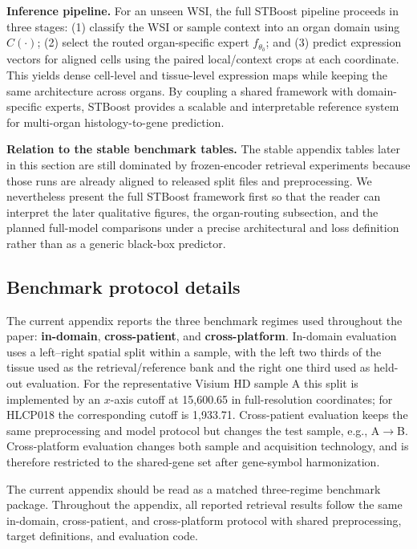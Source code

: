 \documentclass{article}
\begin{document}
\noindent\textbf{Inference pipeline.}
For an unseen WSI, the full STBoost pipeline proceeds in three stages: (1) classify the WSI or sample context into an organ domain using $C(\cdot)$; (2) select the routed organ-specific expert $f_{\theta_{\hat{o}}}$; and (3) predict expression vectors for aligned cells using the paired local/context crops at each coordinate. This yields dense cell-level and tissue-level expression maps while keeping the same architecture across organs. By coupling a shared framework with domain-specific experts, STBoost provides a scalable and interpretable reference system for multi-organ histology-to-gene prediction.

\noindent\textbf{Relation to the stable benchmark tables.}
The stable appendix tables later in this section are still dominated by frozen-encoder retrieval experiments because those runs are already aligned to released split files and preprocessing. We nevertheless present the full STBoost framework first so that the reader can interpret the later qualitative figures, the organ-routing subsection, and the planned full-model comparisons under a precise architectural and loss definition rather than as a generic black-box predictor.

\subsection{Benchmark protocol details}
\label{sec:benchmark_protocol}
The current appendix reports the three benchmark regimes used throughout the paper: \textbf{in-domain}, \textbf{cross-patient}, and \textbf{cross-platform}. In-domain evaluation uses a left--right spatial split within a sample, with the left two thirds of the tissue used as the retrieval/reference bank and the right one third used as held-out evaluation. For the representative Visium HD sample A this split is implemented by an $x$-axis cutoff at 15,600.65 in full-resolution coordinates; for HLCP018 the corresponding cutoff is 1,933.71. Cross-patient evaluation keeps the same preprocessing and model protocol but changes the test sample, e.g., A$\!\rightarrow\!$B. Cross-platform evaluation changes both sample and acquisition technology, and is therefore restricted to the shared-gene set after gene-symbol harmonization.

The current appendix should be read as a matched three-regime benchmark package. Throughout the appendix, all reported retrieval results follow the same in-domain, cross-patient, and cross-platform protocol with shared preprocessing, target definitions, and evaluation code.
\end{document}
